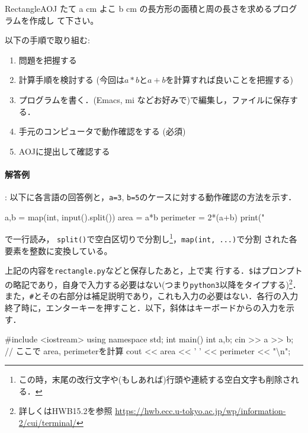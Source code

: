 \begin{psbox}{Rectangle}{AOJ}
たて a cm よこ b cm の長方形の面積と周の長さを求めるプログラムを作成し
て下さい。
\end{psbox}

以下の手順で取り組む:
\begin{enumerate}
\item 問題を把握する
\item 計算手順を検討する (今回は$a*b$と$a+b$を計算すれば良いことを把握する)
\item プログラムを書く．(Emacs, mi などお好みで)で編集し，ファイルに保存する．
\item 手元のコンピュータで動作確認をする (必須)
\item AOJに提出して確認する
\end{enumerate}

\paragraph{解答例}: 以下に各言語の回答例と，\texttt{a=3}, \texttt{b=5}のケースに対する動作確認の方法を示す．

\begin{pybox}
a,b = map(int, input().split())
area = a*b
perimeter = 2*(a+b)
print("
\end{pybox}

で一行読み，
\texttt{split()}で空白区切りで分割し\footnote{この時，末尾の改行文字や(もしあれば)行頭や連続する空白文字も削除される．}，\texttt{map(int, ...)}で分割
された各要素を整数に変換している。

上記の内容を\texttt{rectangle.py}などと保存したあと，上で実
行する．\texttt{\$}はプロンプトの略記であり，自身で入力する必要はない(つまり\texttt{python3}以降をタイプする)\footnote{詳しくはHWB15.2を参照 \url{https://hwb.ecc.u-tokyo.ac.jp/wp/information-2/cui/terminal/}}．また，\texttt{\#}とその右部分は補足説明であり，これも入力の必要はない．各行の入力終了時に，エンターキーを押すこと．以下，斜体はキーボードからの入力を示す．

\begin{cbox}
#include <iostream>
using namespace std;
int main() {
  int a,b;
  cin >> a >> b;
  // ここで area, perimeterを計算
  cout << area << ' ' << perimeter << "\textbackslash{}n";
}
\end{cbox}

